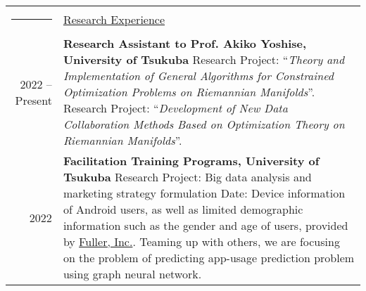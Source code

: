 \documentclass[letterpaper,11pt]{article}
\newcommand{\headingfont}{\LARGE \MakeUppercase }
\newenvironment{SectionTable}[1]{
	\renewcommand*{\arraystretch}{1.0}
	\setlength{\tabcolsep}{10pt}
	\begin{longtable}{Rp{5.2in}} 
		\rule{2.5cm}{4pt} 
		& \underline{#1} \\ %
	}
	{
	\end{longtable}\vspace{-.3cm}
}
\begin{document}
%	
%	
%	
%	
%	



\begin{SectionTable}{\headingfont Research Experience}
	2022 -- Present & 
	\textbf{Research Assistant to Prof. Akiko Yoshise, University of Tsukuba} \newline
	Research Project: ``\textit{Theory and Implementation of General Algorithms for Constrained Optimization Problems on Riemannian Manifolds}''. \newline
	Research Project: ``\textit{Development of New Data Collaboration Methods Based on Optimization Theory on Riemannian Manifolds}''. \\
	
	2022 &
	\textbf{Facilitation Training Programs, University of Tsukuba}
	\newline
	Research Project: Big data analysis and marketing strategy formulation
	\newline
	Date: Device information of Android users, as well as limited demographic information such as the gender and age of users, provided by \href{https://en.fuller-inc.com/}{Fuller, Inc.}. \newline
	Teaming up with others, we are focusing on the problem of predicting app-usage prediction problem using graph neural network.
\end{SectionTable}
\end{document}
